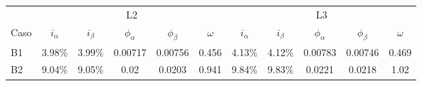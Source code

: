 \begin{tabular}{lcccccccccc}
\toprule
 & \multicolumn{5}{c}{L2} & \multicolumn{5}{c}{L3} \\
Caso & $i_\alpha$ & $i_\beta$ & $\phi_\alpha$ & $\phi_\beta$ & $\omega$ & $i_\alpha$ & $i_\beta$ & $\phi_\alpha$ & $\phi_\beta$ & $\omega$ \\
\midrule
B1 & 3.98\% & 3.99\% & 0.00717 & 0.00756 & 0.456 & 4.13\% & 4.12\% & 0.00783 & 0.00746 & 0.469 \\
B2 & 9.04\% & 9.05\% & 0.02 & 0.0203 & 0.941 & 9.84\% & 9.83\% & 0.0221 & 0.0218 & 1.02 \\
\bottomrule
\end{tabular}
